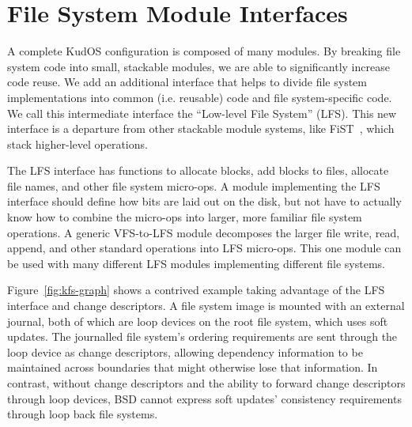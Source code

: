 \preparagraphspacing{}
\section*{File System Module Interfaces}
\label{sec:interfaces}

A complete KudOS configuration is composed of many modules.
By breaking file system code into
small, stackable modules, we are able to significantly increase code reuse.
We add an additional interface that helps to divide file system
implementations into common (i.e. reusable) code and file system-specific code.
We call this intermediate interface the ``Low-level File System'' (LFS). This
new interface is a departure from other stackable module systems,
like FiST~\cite{zadok00fist}, which stack higher-level operations.

The LFS interface has functions to allocate blocks, add blocks to
files, allocate file names, and other file system micro-ops. A module
implementing the LFS interface should define how bits are laid out on
the disk, but not have to actually know how to combine the micro-ops
into larger, more familiar file system operations. 
A generic VFS-to-LFS module decomposes the larger file write,
read, append, and other standard operations into LFS micro-ops. This
one module can be used with many different LFS modules implementing
different file systems.

Figure~\ref{fig:kfs-graph} shows a contrived example taking advantage of the
LFS interface and change descriptors. A file system image is mounted
with an external journal, both of which are loop devices on the root file
system, which uses soft updates.
%
The journalled file system's ordering requirements are sent through the loop
device as change descriptors, allowing dependency information to be maintained
across boundaries that might otherwise lose that information.
%
In contrast, without change descriptors and the ability to forward change
descriptors through loop devices, BSD cannot express soft updates'
consistency requirements through loop back file systems.
